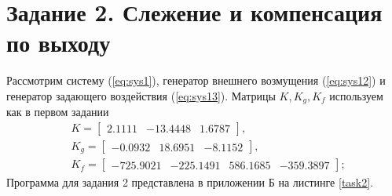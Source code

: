 \documentclass[a4paper, 12pt]{article}
\begin{document}
    \section{Задание 2. Слежение и компенсация по выходу}
    Рассмотрим систему (\ref{eq:sys1}),
    генератор внешнего возмущения (\ref{eq:sys12}) и
    генератор задающего воздействия (\ref{eq:sys13}).
    Матрицы $K,K_g,K_f$ используем как в первом задании
    \begin{align*}
    &K=\begin{bmatrix}
        2.1111  &-13.4448    &1.6787
    \end{bmatrix},\\
    &K_g=
    \begin{bmatrix}
        -0.0932   &18.6951   &-8.1152
    \end{bmatrix},\\
    &K_f=\begin{bmatrix}
        -725.9021 &-225.1491  &586.1685 &-359.3897
    \end{bmatrix};
    \end{align*}
    Программа для задания 2 представлена в приложении Б на листинге \ref{task2}.
\end{document}
